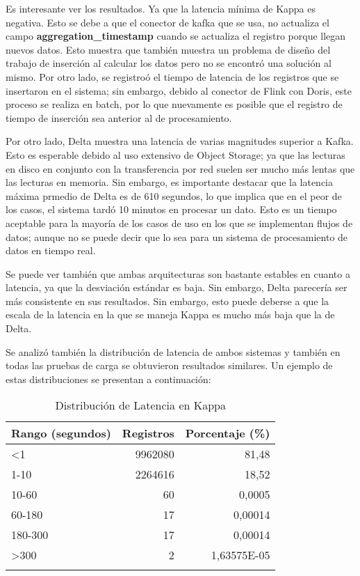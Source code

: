 Es interesante ver los resultados. Ya que la latencia mínima de Kappa es negativa. 
Esto se debe a que el conector de kafka que se usa, no actualiza el campo \textbf{aggregation\_timestamp} cuando se actualiza el registro porque llegan nuevos datos.
Esto muestra que también muestra un problema de diseño del trabajo de inserción al calcular los datos pero no se encontró una solución al mismo. 
Por otro lado, se registroó el tiempo de latencia de los registros que se insertaron en el sistema; sin embargo, debido al conector de Flink con Doris, 
este proceso se realiza en batch, por lo que nuevamente es posible que el registro de tiempo de inserción sea anterior al de procesamiento. 

\newpage

Por otro lado, Delta muestra una latencia de varias magnitudes superior a Kafka. Esto es esperable debido al uso extensivo de Object Storage;
ya que las lecturas en disco en conjunto con la transferencia por red suelen ser mucho más lentas que las lecturas en memoria.
Sin embargo, es importante destacar que la latencia máxima prmedio de Delta es de 610 segundos, lo que implica que en el peor de los casos,
el sistema tardó 10 minutos en procesar un dato.
Esto es un tiempo aceptable para la mayoría de los casos de uso en los que se implementan flujos de datos; 
aunque no se puede decir que lo sea para un sistema de procesamiento de datos en tiempo real. \newline

Se puede ver también que ambas arquitecturas son bastante estables en cuanto a latencia, ya que la desviación estándar es baja.
Sin embargo, Delta parecería ser más consistente en sus resultados. 
Sin embargo, esto puede deberse a que la escala de la latencia en la que se maneja Kappa es mucho más baja que la de Delta. \newline

Se analizó también la distribución de latencia de ambos sistemas y también en todas las pruebas de carga se obtuvieron resultados similares.
Un ejemplo de estas distribuciones se presentan a continuación:

\begin{longtable}{|l|r|r|}
    \hline
    \textbf{Rango (segundos)} & \textbf{Registros} & \textbf{Porcentaje (\%)} \\
    \hline
    \endhead
    <1 & 9962080 & 81,48 \\
    \hline
    1-10 & 2264616 & 18,52 \\
    \hline
    10-60 & 60 & 0,0005 \\
    \hline
    60-180 & 17 & 0,00014 \\
    \hline
    180-300 & 17 & 0,00014 \\
    \hline
    >300 & 2 & 1,63575E-05 \\
    \hline
    \caption{Distribución de Latencia en Kappa} \\
\end{longtable}

